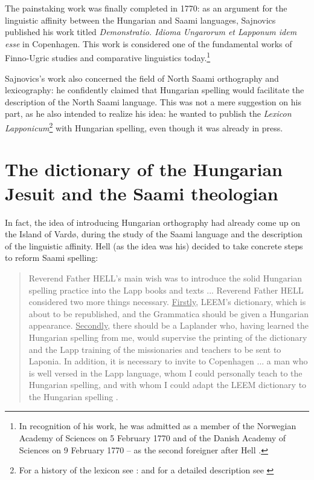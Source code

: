 \documentclass[output=paper,colorlinks,citecolor=brown,arabicfont,chinesefont]{langscibook}
\begin{document}
The painstaking work was finally completed in 1770: as an argument for the linguistic affinity between the Hungarian and Saami languages, Sajnovics published his work titled \emph{Demonstratio. Idioma Ungarorum et Lapponum idem esse} in Copenhagen. This work is considered one of the fundamental works of Finno-Ugric studies and comparative linguistics today.\footnote{In recognition of his work, he was admitted as a member of the Norwegian Academy of Sciences on 5 February 1770 and of the Danish Academy of Sciences on 9 February 1770 – as the second foreigner after Hell \citep[135, 137]{Sajnovics1990}.}

Sajnovics’s work also concerned the field of North Saami orthography and lexicography: he confidently claimed that Hungarian spelling would facilitate the description of the North Saami language. This was not a mere suggestion on his part, as he also intended to realize his idea: he wanted to publish the \textit{Lexicon Lapponicum}\footnote{For a history of the lexicon see \citet{Kelemen2018}:  and for a detailed description see \citet{Djarv2003}} with Hungarian spelling, even though it was already in press.

\section{The dictionary of the Hungarian Jesuit and the Saami theologian}

In fact, the idea of introducing Hungarian orthography had already come up on the Island of Vardø, during the study of the Saami language and the description of the linguistic affinity. Hell (as the idea was his) decided to take concrete steps to reform Saami spelling:

\begin{quote}
    Reverend Father HELL’s main wish was to introduce the solid Hungarian spelling practice into the Lapp books and texts ... Reverend Father HELL considered two more things necessary. \uline{Firstly}, LEEM’s dictionary, which is about to be republished, and the Grammatica should be given a Hungarian appearance. \uline{Secondly}, there should be a Laplander who, having learned the Hungarian spelling from me, would supervise the printing of the dictionary and the Lapp training of the missionaries and teachers to be sent to Laponia. In addition, it is necessary to invite to Copenhagen ... a man who is well versed in the Lapp language, whom I could personally teach to the Hungarian spelling, and with whom I could adapt the LEEM dictionary to the Hungarian spelling \citep[42--43]{Sajnovics1994}.
\end{quote}
\end{document}
